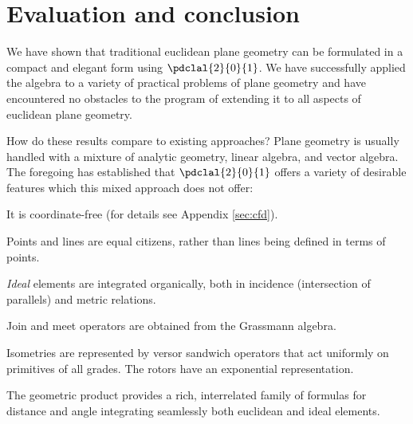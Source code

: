 \documentclass{birkjour}
\begin{document}
\section{Evaluation and conclusion}
\label{sec:eac}
We  have shown that traditional euclidean plane geometry can be formulated in a compact and elegant form using $\pdclal{2}{0}{1}$.  We have successfully applied the algebra  to a variety of practical problems of plane geometry and have encountered no obstacles to the program of extending it to all aspects of euclidean plane geometry.  

How do these results compare to existing approaches?  Plane geometry is usually handled with a mixture of analytic geometry, linear algebra, and vector algebra.  The foregoing has established that  $\pdclal{2}{0}{1}$ offers a variety of desirable  features which this mixed approach does not offer:
\begin{compactenum}
\item It is coordinate-free (for details see Appendix \ref{sec:cfd}).
\item Points and lines are equal citizens, rather than  lines being defined in terms of points.
\item \emph{Ideal} elements are integrated organically, both in incidence (intersection of parallels) and metric relations.
\item Join and meet operators are obtained from the Grassmann algebra.
\item Isometries are represented by versor sandwich operators that act uniformly on primitives of all grades.  The rotors have an exponential representation.
\item The geometric product provides a rich, interrelated family of formulas for distance and angle integrating seamlessly both euclidean and ideal elements.
\end{compactenum}
\end{document}
